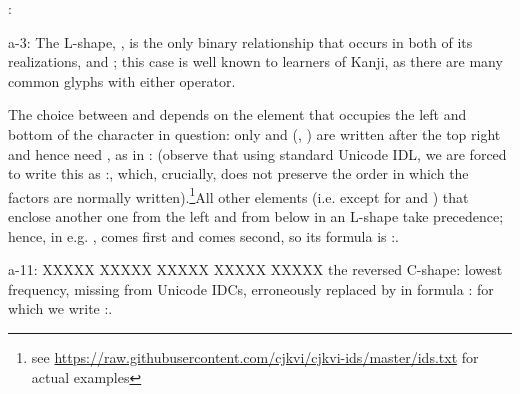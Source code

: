 \vspace{\myLineheight}\begin{multicols}{2}:

{\mktsStyleBold{}a-3}: The L-shape, \cjkgGlue{}, is the only binary relationship that occurs in both of
its realizations, \cjkgGlue{} and \cjkgGlue{}; this case is well known to learners of Kanji, as
there are many common glyphs with either operator.

The choice between \cjkgGlue{} and \cjkgGlue{} depends on the element that occupies the left and bottom of the character in
question: only \cjkgGlue{} and \cjkgGlue{} (\cjkgGlue{}, \cjkgGlue{}) are written {\mktsStyleItalic{}after\/} the top right and hence
need \cjkgGlue{}, as in \cjkgGlue{}:\cjkgGlue{} (observe that using standard Unicode IDL, we are forced to write
this as
\cjkgGlue{}:\cjkgGlue{}\cjkgGlue{}, which,
crucially, does not preserve the order in which the factors are normally written).\footnote{see
\url{https://raw.githubusercontent.com/cjkvi/cjkvi-ids/master/ids.txt} for actual examples}All other elements (i.e. except for \cjkgGlue{} and \cjkgGlue{}) that enclose another one from the left and
from below in an L-shape take precedence; hence, in e.g. \cjkgGlue{}, \cjkgGlue{} comes first and \cjkgGlue{}
comes second, so its formula is \cjkgGlue{}:\cjkgGlue{}\cjkgGlue{}.

{\mktsStyleBold{}a-11}: XXXXX XXXXX XXXXX XXXXX XXXXX the reversed C-shape: lowest frequency, missing from Unicode IDCs,
erroneously replaced by \cjkgGlue{} in formula
\cjkgGlue{}:\cjkgGlue{}\cjkgGlue{} for which we write \cjkgGlue{}:\cjkgGlue{}\cjkgGlue{}.


\end{multicols}
